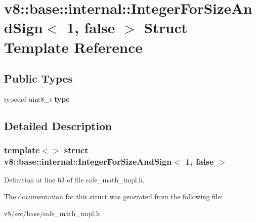 \hypertarget{structv8_1_1base_1_1internal_1_1IntegerForSizeAndSign_3_011_00_01false_01_4}{}\section{v8\+:\+:base\+:\+:internal\+:\+:Integer\+For\+Size\+And\+Sign$<$ 1, false $>$ Struct Template Reference}
\label{structv8_1_1base_1_1internal_1_1IntegerForSizeAndSign_3_011_00_01false_01_4}
\subsection*{Public Types}
\begin{DoxyCompactItemize}
\item 
\mbox{\label{structv8_1_1base_1_1internal_1_1IntegerForSizeAndSign_3_011_00_01false_01_4_a71995ca31dfbedfb1ea5933f8713e9ef}} 
typedef uint8\+\_\+t {\bfseries type}
\end{DoxyCompactItemize}


\subsection{Detailed Description}
\subsubsection*{template$<$$>$\newline
struct v8\+::base\+::internal\+::\+Integer\+For\+Size\+And\+Sign$<$ 1, false $>$}



Definition at line 63 of file safe\+\_\+math\+\_\+impl.\+h.



The documentation for this struct was generated from the following file\+:\begin{DoxyCompactItemize}
\item 
v8/src/base/safe\+\_\+math\+\_\+impl.\+h\end{DoxyCompactItemize}

